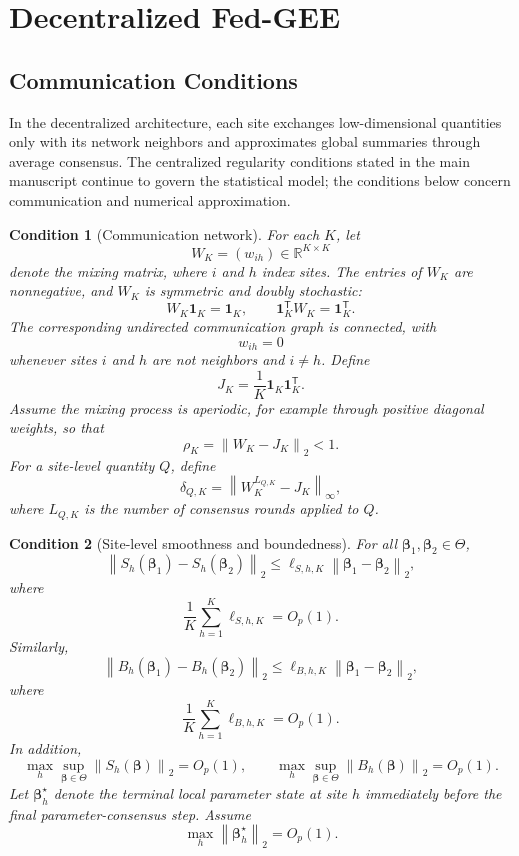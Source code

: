 \documentclass[12pt]{article}
\newtheorem{condition}{Condition}[section]
\theoremstyle{remark}
\numberwithin{equation}{section}
\newcommand{\trans}{\mathsf{T}}
\newcommand{\R}{\mathbb{R}}
\newcommand{\bbeta}{\boldsymbol{\beta}}
\newcommand{\norm}[1]{\left\lVert#1\right\rVert}
\begin{document}
\section{Decentralized Fed-GEE}
\label{app:H}

\subsection{Communication Conditions}

In the decentralized architecture, each site exchanges low-dimensional
quantities only with its network neighbors and approximates global summaries
through average consensus. The centralized regularity conditions stated in
the main manuscript continue to govern the statistical model; the conditions
below concern communication and numerical approximation.

\begin{condition}[Communication network]
\label{cond:supp_network}
For each \(K\), let
\[
W_K=(w_{ih})\in\R^{K\times K}
\]
denote the mixing matrix, where \(i\) and \(h\) index sites. The entries of
\(W_K\) are nonnegative, and \(W_K\) is symmetric and doubly stochastic:
\[
W_K\mathbf 1_K=\mathbf 1_K,
\qquad
\mathbf 1_K^{\trans}W_K=\mathbf 1_K^{\trans}.
\]
The corresponding undirected communication graph is connected, with
\[
w_{ih}=0
\]
whenever sites \(i\) and \(h\) are not neighbors and \(i\ne h\). Define
\[
J_K=\frac1K\mathbf 1_K\mathbf 1_K^{\trans}.
\]
Assume the mixing process is aperiodic, for example through positive diagonal
weights, so that
\[
\rho_K=\norm{W_K-J_K}_2<1.
\]
For a site-level quantity \(Q\), define
\begin{equation}
\delta_{Q,K}
=
\norm{W_K^{L_{Q,K}}-J_K}_{\infty},
\label{eq:supp_consensus_error}
\end{equation}
where \(L_{Q,K}\) is the number of consensus rounds applied to \(Q\).
\end{condition}

\begin{condition}[Site-level smoothness and boundedness]
\label{cond:supp_site_smoothness}
For all \(\bbeta_1,\bbeta_2\in\Theta\),
\[
\norm{S_h(\bbeta_1)-S_h(\bbeta_2)}_2
\le
\ell_{S,h,K}\norm{\bbeta_1-\bbeta_2}_2,
\]
where
\[
\frac1K\sum_{h=1}^K\ell_{S,h,K}=O_p(1).
\]
Similarly,
\[
\norm{B_h(\bbeta_1)-B_h(\bbeta_2)}_2
\le
\ell_{B,h,K}\norm{\bbeta_1-\bbeta_2}_2,
\]
where
\[
\frac1K\sum_{h=1}^K\ell_{B,h,K}=O_p(1).
\]
In addition,
\[
\max_h\sup_{\bbeta\in\Theta}\norm{S_h(\bbeta)}_2=O_p(1),
\qquad
\max_h\sup_{\bbeta\in\Theta}\norm{B_h(\bbeta)}_2=O_p(1).
\]
Let \(\bbeta_h^\star\) denote the terminal local parameter state at site
\(h\) immediately before the final parameter-consensus step. Assume
\[
\max_h\norm{\bbeta_h^\star}_2=O_p(1).
\]
\end{condition}
\end{document}
